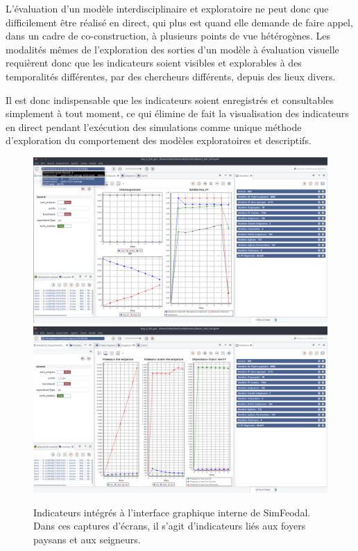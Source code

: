	L'évaluation d'un modèle interdisciplinaire et exploratoire ne peut donc que difficilement être réalisé en direct, qui plus est quand elle demande de faire appel, dans un cadre de co-construction, à plusieurs points de vue hétérogènes.
	Les modalités mêmes de l'exploration des sorties d'un modèle à évaluation visuelle requièrent donc que les indicateurs soient visibles et explorables à des temporalités différentes, par des chercheurs différents, depuis des lieux divers.
	
	Il est donc indispensable que les indicateurs soient enregistrés et consultables simplement à tout moment, ce qui élimine de fait la visualisation des indicateurs en direct pendant l'exécution des simulations comme unique méthode d'exploration du comportement des modèles exploratoires et descriptifs.
	
	
	\begin{figure}[H]
		\captionsetup{width=\linewidth}
		\includegraphics[width=\linewidth]{img/SimFeodal_GUI_FP.png}
		\includegraphics[width=\linewidth]{img/SimFeodal_GUI_seigneurs.png}
		\caption{Indicateurs intégrés à l'interface graphique interne de SimFeodal.
		Dans ces captures d'écrans, il s'agit d'indicateurs liés aux foyers paysans et aux seigneurs.}
		\label{fig:simfeodal_gui_indicateurs}
	\end{figure}
	
